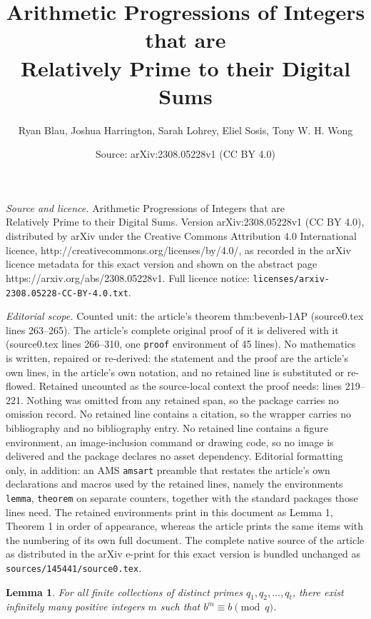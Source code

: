 \documentclass[10pt,a4paper]{amsart}
\title{Arithmetic Progressions of Integers that are\\Relatively Prime to their Digital Sums}
\author{Ryan Blau, Joshua Harrington, Sarah Lohrey, Eliel Sosis, Tony W. H. Wong}
\date{Source: arXiv:2308.05228v1 (CC BY 4.0)}
\newtheorem{lemma}{Lemma}
\begin{document}
\maketitle

\noindent\emph{Source and licence.} Arithmetic Progressions of Integers that are\\Relatively Prime to their Digital Sums. Version arXiv:2308.05228v1 (CC BY 4.0), distributed by arXiv under the Creative Commons Attribution 4.0 International licence, http://creativecommons.org/licenses/by/4.0/, as recorded in the arXiv licence metadata for this exact version and shown on the abstract page https://arxiv.org/abs/2308.05228v1. Full licence notice: \texttt{licenses/arxiv-2308.05228-CC-BY-4.0.txt}.\par\smallskip

\noindent\textit{Editorial scope.} Counted unit: the article's theorem thm:bevenb-1AP (source0.tex lines 263--265). The article's complete original proof of it is delivered with it (source0.tex lines 266--310, one \texttt{proof} environment of 45 lines). No mathematics is written, repaired or re-derived: the statement and the proof are the article's own lines, in the article's own notation, and no retained line is substituted or re-flowed.  Retained uncounted as the source-local context the proof needs: lines 219--221.  Nothing was omitted from any retained span, so the package carries no omission record.  No retained line contains a citation, so the wrapper carries no bibliography and no bibliography entry.  No retained line contains a figure environment, an image-inclusion command or drawing code, so no image is delivered and the package declares no asset dependency.  Editorial formatting only, in addition: an AMS \texttt{amsart} preamble that restates the article's own declarations and macros used by the retained lines, namely the environments \texttt{lemma}, \texttt{theorem} on separate counters, together with the standard packages those lines need.  The retained environments print in this document as Lemma 1, Theorem 1 in order of appearance, whereas the article prints the same items with the numbering of its own full document.  The complete native source of the article as distributed in the arXiv e-print for this exact version is bundled unchanged as \texttt{sources/145441/source0.tex}.
\begin{lemma}\label{lem:b^m=b}
For all finite collections of distinct primes $q_1,q_2,\dotsc,q_t$, there exist infinitely many positive integers $m$ such that $b^m\equiv b\pmod{q}$.
\end{lemma}
\end{document}
